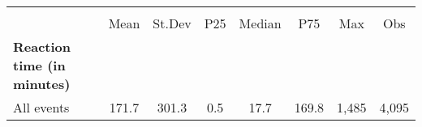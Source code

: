 {
\def\sym#1{\ifmmode^{#1}\else\(^{#1}\)\fi}
\begin{tabular}{l*{1}{ccccccc}}
\hline\hline
                    &\multicolumn{7}{c}{}                                                                      \\
                    &        Mean&      St.Dev&         P25&      Median&         P75&         Max&         Obs\\
\hline
\textbf{Reaction time (in minutes)}&            &            &            &            &            &            &            \\
All events          &       171.7&       301.3&         0.5&        17.7&       169.8&       1,485&       4,095\\
\hline\hline
\end{tabular}
}
